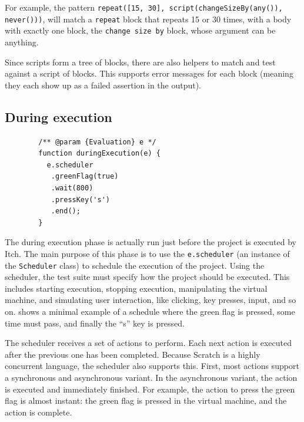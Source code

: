 \documentclass[../main]{subfiles}
\begin{document}
For example, the pattern \texttt{repeat([15, 30], script(changeSizeBy(any()), never()))}, will match a \texttt{repeat} block that repeats 15 or 30 times, with a body with exactly one block, the \texttt{change size by} block, whose argument can be anything.

Since scripts form a tree of blocks, there are also helpers to match and test against a script of blocks.
This supports error messages for each block (meaning they each show up as a failed assertion in the output).

\subsection{During execution}\label{subsec:during-execution}

\begin{listing}
    \begin{verbatim}
        /** @param {Evaluation} e */
        function duringExecution(e) {
          e.scheduler
           .greenFlag(true)
           .wait(800)
           .pressKey('s')
           .end();
        }
    \end{verbatim}
    \caption{An example of the during execution phase where the scheduler is used to first press the green flag, wait \qty{800}{\milli\second}, press the ``s'' key, and finally end execution.}\label{lst:itch-scheduler-example}
\end{listing}

The during execution phase is actually run just before the project is executed by Itch.
The main purpose of this phase is to use the \texttt{e.scheduler} (an instance of the \texttt{Scheduler} class) to schedule the execution of the project.
Using the scheduler, the test suite must specify how the project should be executed.
This includes starting execution, stopping execution, manipulating the virtual machine, and simulating user interaction, like clicking, key presses, input, and so on.
 shows a minimal example of a schedule where the green flag is pressed, some time must pass, and finally the ``s'' key is pressed.

The scheduler receives a set of actions to perform.
Each next action is executed after the previous one has been completed.
Because Scratch is a highly concurrent language, the scheduler also supports this.
First, most actions support a synchronous and asynchronous variant.
In the asynchronous variant, the action is executed and immediately finished.
For example, the action to press the green flag is almost instant: the green flag is pressed in the virtual machine, and the action is complete.
\end{document}
